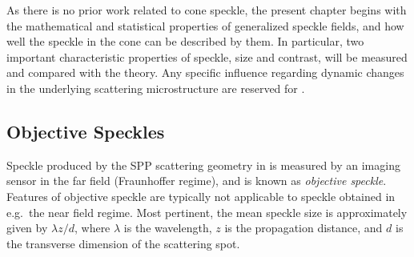 As there is no prior work related to cone speckle, the present chapter begins
with the mathematical and statistical properties of generalized speckle
fields, and how well the speckle in the cone can be described by them.  In
particular, two important characteristic properties of speckle, size
and contrast, will be measured and compared with the theory.  Any specific
influence regarding dynamic changes in the underlying scattering
microstructure are reserved for .

\subsection{Objective Speckles}
Speckle produced by the SPP scattering geometry in
 is measured by an imaging sensor in the far
field (Fraunhoffer regime), and is known as \textit{objective speckle}.
Features of objective speckle are typically not applicable to speckle obtained
in e.g.\ the near field regime.  Most pertinent, the mean speckle size is
approximately given by $\lambda z/d$, where $\lambda$ is the wavelength, $z$
is the propagation distance, and $d$ is the transverse dimension of the
scattering spot\cite{dainty1975laser}.
